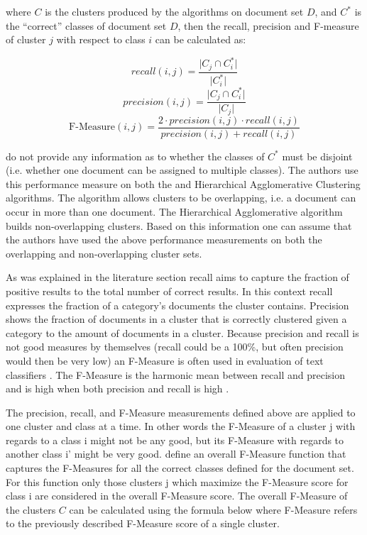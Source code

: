where \(C\) is the clusters produced by the algorithms on document set \(D\), and \(C^*\) is the ``correct'' classes of document set \(D\), then the recall, precision and F-measure of cluster \(j\) with respect to class \(i\) can be calculated as:

\begin{displaymath}
recall(i,j) = \frac{\vert C_{j} \cap C_i^* \vert}{\vert C_i^* \vert}
\end{displaymath}
\begin{displaymath}
precision(i,j) = \frac{\vert C_{j} \cap C_i^* \vert}{\vert C_{j} \vert}
\end{displaymath}
\begin{displaymath}
\text{F-Measure}(i,j) = \frac{2 \cdot precision(i,j) \cdot recall(i,j)}{precision(i,j) + recall(i,j)}
\end{displaymath}

\cite{Chim2007} do not provide any information as to whether the classes of \(C^*\) must be disjoint (i.e. whether one document can be assigned to multiple classes). The authors use this performance measure on both the \STC and Hierarchical Agglomerative Clustering algorithms. The \STC algorithm allows clusters to be overlapping, i.e. a document can occur in more than one document. The Hierarchical Agglomerative algorithm builds non-overlapping clusters. Based on this information one can assume that the authors have used the above performance measurements on both the overlapping and non-overlapping cluster sets.

As was explained in the literature section recall aims to capture the fraction of positive results to the total number of correct results. In this context recall expresses the fraction of a category's documents the cluster contains. Precision shows the fraction of documents in a cluster that is correctly clustered given a category to the amount of documents in a cluster. Because precision and recall is not good measures by themselves (recall could be a 100\%, but often precision would then be very low) an F-Measure is often used in evaluation of text classifiers \cite{Baeza-Yates2011a}. The F-Measure is the harmonic mean between recall and precision and is high when both precision and recall is high \cite{Baeza-Yates2011b}. 

The precision, recall, and F-Measure measurements defined above are applied to one cluster and class at a time. In other words the F-Measure of a cluster j with regards to a class i might not be any good, but its F-Measure with regards to another class i' might be very good. \cite{Chim2007} define an overall F-Measure function that captures the F-Measures for all the correct classes defined for the document set. For this function only those clusters j which maximize the F-Measure score for class i are considered in the overall F-Measure score. The overall F-Measure of the clusters \(C\) can be calculated using the formula below where F-Measure refers to the previously described F-Measure score of a single cluster.

